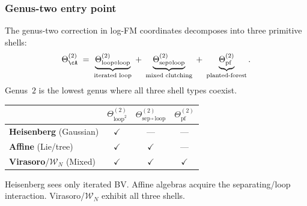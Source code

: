 \subsubsection{Genus-two entry point}

\begin{construction}
\label{const:vol1-genus-two-shells}
The genus-two correction in log-FM coordinates decomposes into
three primitive shells:
\begin{equation}\label{eq:genus-two-shells}
\Theta_\cA^{(2)}
\;=\;
\underbrace{\Theta^{(2)}_{\mathrm{loop} \circ \mathrm{loop}}}_{%
\text{iterated loop}}
\;+\;
\underbrace{\Theta^{(2)}_{\mathrm{sep} \circ \mathrm{loop}}}_{%
\text{mixed clutching}}
\;+\;
\underbrace{\Theta^{(2)}_{\mathrm{pf}}}_{%
\text{planted-forest}}.
\end{equation}
Genus~$2$ is the lowest genus where all three shell types
coexist.
\begin{center}
\renewcommand{\arraystretch}{1.3}
\begin{tabular}{lccc}
& $\Theta^{(2)}_{\mathrm{loop}^2}$
& $\Theta^{(2)}_{\mathrm{sep} \circ \mathrm{loop}}$
& $\Theta^{(2)}_{\mathrm{pf}}$ \\
\hline
\textbf{Heisenberg} (Gaussian)
  & $\checkmark$ & --- & --- \\
\textbf{Affine} (Lie/tree)
  & $\checkmark$ & $\checkmark$ & --- \\
\textbf{Virasoro}/\textbf{$\mathcal{W}_N$} (Mixed)
  & $\checkmark$ & $\checkmark$ & $\checkmark$ \\
\end{tabular}
\end{center}
Heisenberg sees only iterated BV\@.  Affine algebras acquire
the separating/loop interaction.  Virasoro/$\mathcal{W}_N$
exhibit all three shells.
\end{construction}

